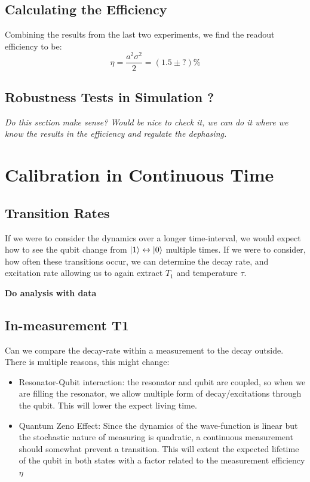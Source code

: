 
\subsection{Calculating the Efficiency}
Combining the results from the last two experiments, we find the readout efficiency to be:
\begin{equation}
    \eta = \frac{a^2\sigma^2}{2} = (1.5 \pm ?) \% 
\end{equation}

\subsection{Robustness Tests in Simulation ? }
\textit{Do this section make sense? Would be nice to check it, we can do it where we know the results in the efficiency and regulate the dephasing.}




\section{Calibration in Continuous Time}

\subsection{Transition Rates}
If we were to consider the dynamics over a longer time-interval, we would expect how to see the qubit change from $\ket{1} \leftrightarrow \ket{0}$ multiple times. If we were to consider, how often these transitions occur, we can determine the decay rate, and excitation rate allowing us to again extract $T_1$ and temperature $\tau$.

\textbf{Do analysis with data}



\subsection{In-measurement T1 }
Can we compare the decay-rate within a measurement to the decay outside. There is multiple reasons, this might change:
\begin{itemize}
    \item Resonator-Qubit interaction: the resonator and qubit are coupled, so when we are filling the resonator, we allow multiple form of decay/excitations through the qubit. This will lower the expect living time.
    \item Quantum Zeno Effect: Since the dynamics of the wave-function is linear but the stochastic nature of measuring is quadratic, a continuous measurement should somewhat prevent a transition. This will extent the expected lifetime of the qubit in both states with a factor related to the measurement efficiency $\eta$
\end{itemize}


